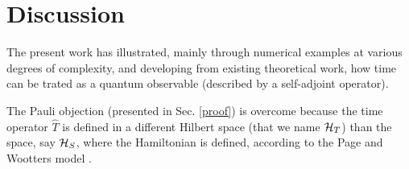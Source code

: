 \section{Discussion}

The present work has illustrated,
mainly through numerical examples
at various degrees of complexity,
and developing from existing theoretical work,
how time can be trated as a quantum observable
(described by a self-adjoint operator).

The Pauli objection (presented in Sec. \ref{proof})
is overcome because the time operator $\hat{T}$
is defined in a different Hilbert space (that we name $\mathcal{H}_T$)
than the space, say $\mathcal{H}_S$, where the Hamiltonian is defined,
according to the Page and Wootters model
\parencite{PageWootters, Lloyd:Time, Marletto:Evolution, Maccone:QMOT, Maccone:Pauli}.